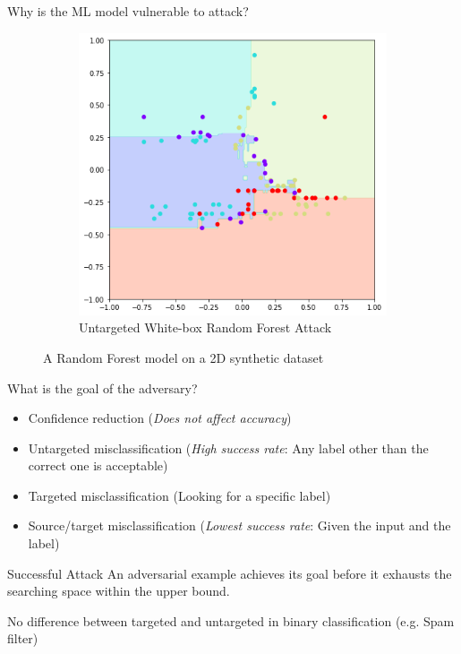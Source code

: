 \documentclass[9pt]{beamer}
\begin{document}
\begin{frame}{Why is the ML model vulnerable to attack?}
\begin{figure}
\begin{subfigure}[t]{0.38\linewidth}
        \includegraphics[width=\linewidth]{images/dt_adv_examples.png}
        \caption{Untargeted White-box Random Forest Attack}
    \end{subfigure}
    \caption{A Random Forest model on a 2D synthetic dataset}
\end{figure}

\hyperlink{reliability}{}
\end{frame}

\begin{frame}{What is the goal of the adversary?}
\begin{itemize}
    \item Confidence reduction (\textit{Does not affect accuracy})
    \item Untargeted misclassification (\textit{High success rate}: Any label other than the correct one is acceptable)
    \item Targeted misclassification (Looking for a specific label)
    \item Source/target misclassification (\textit{Lowest success rate}: Given the input and the label)
\end{itemize}

\begin{block}{Successful Attack}
An adversarial example achieves its goal before it exhausts the searching space within the upper bound.
\end{block}

No difference between targeted and untargeted in binary classification (e.g. Spam filter)
\end{frame}
\end{document}
